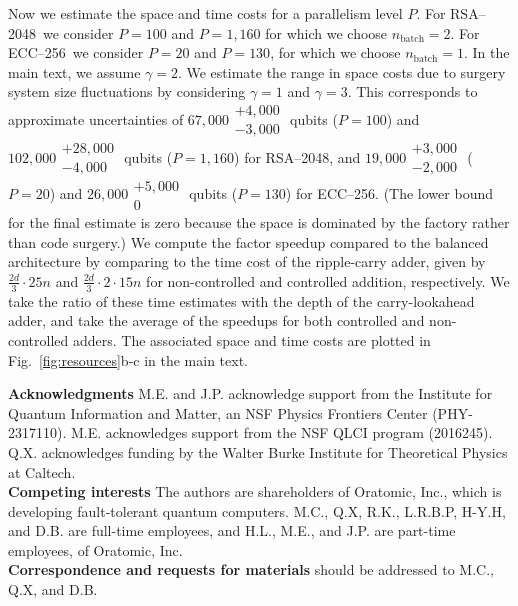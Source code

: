 \documentclass[reprint,twocolumn,secnumarabic,amssymb, aps, prx]{revtex4-2}
\newcommand{\ecc}{\mbox{ECC--256}}
\newcommand{\rsa}{\mbox{RSA--2048}}
\begin{document}
Now we estimate the space and time costs for a parallelism level $P$. For \rsa\ we consider \mbox{$P=100$} and \mbox{$P=1{,}160$} for which we choose \mbox{$n_\text{batch}=2$}. For \ecc\ we consider \mbox{$P=20$} and \mbox{$P=130$}, for which we choose \mbox{$n_\text{batch}=1$}. In the main text, we assume \mbox{$\gamma=2$}. We estimate the range in space costs due to surgery system size fluctuations by considering $\gamma=1$ and $\gamma=3$. This corresponds to approximate uncertainties of $67{,}000\substack{+4{,}000 \\ -3{,}000}$ qubits (\mbox{$P=100$}) and $102{,}000\substack{+28{,}000 \\ -4{,}000}$ qubits (\mbox{$P=1{,}160$}) for \rsa, and $19{,}000\substack{+3{,}000 \\ -2{,}000}$ (\mbox{$P=20$}) and $26{,}000\substack{+5{,}000 \\ 0}$ qubits (\mbox{$P=130$}) for \ecc. (The lower bound for the final estimate is zero because the space is dominated by the factory rather than code surgery.) We compute the factor speedup compared to the balanced architecture by comparing to the time cost of the ripple-carry adder, given by $\frac{2d}{3}\cdot25n$ and $\frac{2d}{3}\cdot2\cdot 15n$ for non-controlled and controlled addition, respectively. We take the ratio of these time estimates with the depth of the carry-lookahead adder, and take the average of the speedups for both controlled and non-controlled adders. The associated space and time costs are plotted in Fig.~\ref{fig:resources}b-c in the main text.

\vspace{1cm}
\noindent\textbf{Acknowledgments}
 M.E. and J.P. acknowledge support from the Institute for Quantum Information and Matter, an NSF Physics Frontiers Center (PHY-2317110).  M.E. acknowledges support from the NSF QLCI program (2016245). Q.X. acknowledges funding by the Walter Burke Institute for Theoretical Physics at Caltech.\\

\noindent\textbf{Competing interests}
The authors are shareholders of Oratomic, Inc., which is developing fault-tolerant quantum computers. M.C., Q.X, R.K., L.R.B.P, H-Y.H, and D.B. are full-time employees, and H.L., M.E., and J.P. are part-time employees, of Oratomic, Inc.
\\

\noindent\textbf{Correspondence and requests for materials} should be addressed to M.C., Q.X, and D.B.
\end{document}
